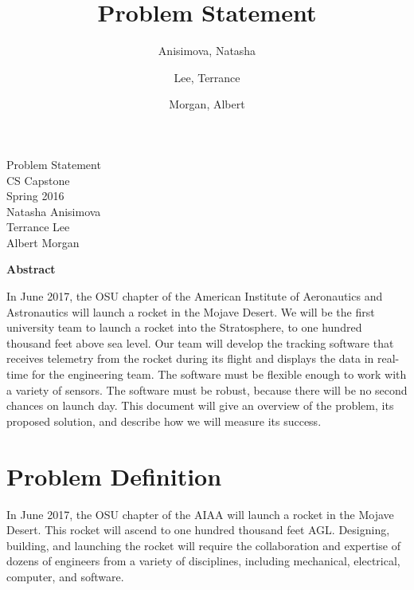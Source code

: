 \documentclass[10pt,journal,draftclsnofoot,onecolumn]{IEEEtran}
\begin{document}
	\singlespace
	
	\title{\vspace{2in}Problem Statement}
	
	\author {
		Anisimova, Natasha
		\and
		Lee, Terrance
		\and
		Morgan, Albert
	}
	
	
	\pagestyle{empty}
	\vspace*{2in}
	\begin{center}
		\huge
		Problem Statement\\
		\normalsize
		\vspace{5mm}
		CS Capstone\\
		Spring 2016\\
		\vspace{5mm}
		Natasha Anisimova\\
		Terrance Lee\\
		Albert Morgan
	\end{center}
	
	\vspace{5mm}
	
	\begin{center}
		\textbf{Abstract}
	\end{center}
	
	\begin{adjustwidth}{2in}{2in}
		In June 2017, the \ac{OSU} chapter of the
		American Institute of Aeronautics and Astronautics will launch a rocket in the Mojave Desert.
		We will be the first university team to launch a rocket into the Stratosphere, to one hundred thousand feet above sea level.
		Our team will develop the tracking software that receives
		telemetry from the rocket during its flight
		and displays the data in real-time for the engineering team.
		The software must be flexible enough to work with a variety of sensors.
		The software must be robust,
		because there will be no second chances on launch day.
		This document will give an overview of the problem,
		its proposed solution,
		and describe how we will measure its success.
	\end{adjustwidth}
	
	\newpage
	\pagestyle{headings}
	\section{Problem Definition}
	In June 2017, the \ac{OSU} chapter of the
	\ac{AIAA} will launch a rocket in the Mojave Desert.
	This rocket will ascend to one hundred thousand feet \ac{AGL}.
	Designing, building, and launching the rocket will require the
	collaboration and expertise of dozens of engineers from a variety
	of disciplines, including mechanical, electrical, computer, and
	software.
	
\end{document}
